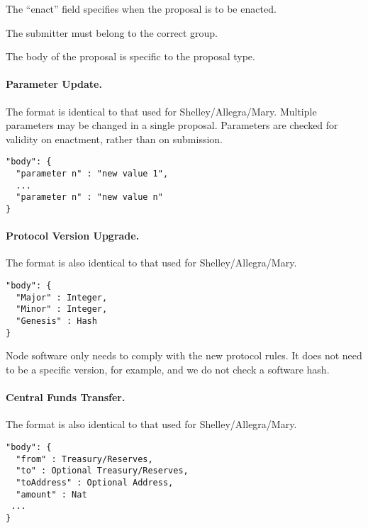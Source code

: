 The ``enact'' field specifies when the proposal is to be enacted.

The submitter must belong to the correct group.  

The body of the proposal is specific to the proposal type.

\newpage
\paragraph{Parameter Update.}  The format is identical to that used for Shelley/Allegra/Mary.  Multiple parameters may be changed in a single proposal.
Parameters are checked for validity on enactment, rather than on submission.


\begin{verbatim}
"body": {
  "parameter n" : "new value 1",
  ...
  "parameter n" : "new value n"
}
\end{verbatim}

\paragraph{Protocol Version Upgrade.}  The format is also identical to that used for Shelley/Allegra/Mary.


\begin{verbatim}
"body": {
  "Major" : Integer,
  "Minor" : Integer,
  "Genesis" : Hash
}
\end{verbatim}

Node software only needs to comply with the new protocol rules.  It does not need to be a specific version, for example, and we do not check a software hash.



\paragraph{Central Funds Transfer.}  The format is also identical to that used for Shelley/Allegra/Mary.


\begin{verbatim}
"body": {
  "from" : Treasury/Reserves,
  "to" : Optional Treasury/Reserves,
  "toAddress" : Optional Address,
  "amount" : Nat
 ...
}
\end{verbatim}

